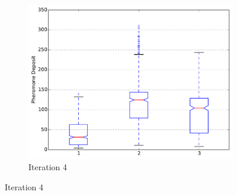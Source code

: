 \documentclass{llncs}
\begin{document}
\begin{figure}[H]
\begin{subfigure}[b]{0.3\textwidth}
                \includegraphics[width=\textwidth]{PLT/Comparision/BOXPLOT/Iteration4}
                \caption{Iteration 4}
                \label{fig:plt_iter4}
        \end{subfigure}
        
        \vspace{5mm}
        

\end{figure}
\end{document}
